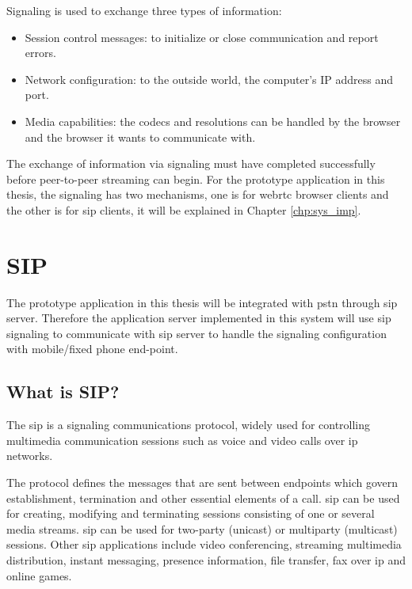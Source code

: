 \noindent Signaling is used to exchange three types of information\cite{html5rock:webrtc}:

\begin{itemize}[topsep=-1em,parsep=0em,itemsep=0em]
 \item Session control messages: to initialize or close communication and report errors.
 \item Network configuration: to the outside world, the computer's IP address and port.
 \item Media capabilities: the codecs and resolutions can be handled by the browser and the browser it wants to communicate with.
\end{itemize}

\par The exchange of information via signaling must have completed successfully before peer-to-peer streaming can begin. For the prototype application in this thesis, the signaling has two mechanisms, one is for \gls{webrtc} browser clients and the other is for \gls{sip} clients, it will be explained in Chapter \ref{chp:sys_imp}.

\section{SIP}
\noindent The prototype application in this thesis will be integrated with \gls{pstn} through \gls{sip} server. Therefore the application server implemented in this system will use \gls{sip} signaling to communicate with \gls{sip} server to handle the signaling configuration with mobile/fixed phone end-point.

\subsection{What is SIP?}
\noindent The \gls{sip} is a signaling communications protocol, widely used for controlling multimedia communication sessions such as voice and video calls over \gls{ip} networks.

\par The protocol defines the messages that are sent between endpoints which govern establishment, termination and other essential elements of a call. \gls{sip} can be used for creating, modifying and terminating sessions consisting of one or several media streams. \gls{sip} can be used for two-party (unicast) or multiparty (multicast) sessions. Other \gls{sip} applications include video conferencing, streaming multimedia distribution, instant messaging, presence information, file transfer, fax over \gls{ip} and online games.\cite{wiki:sip}

